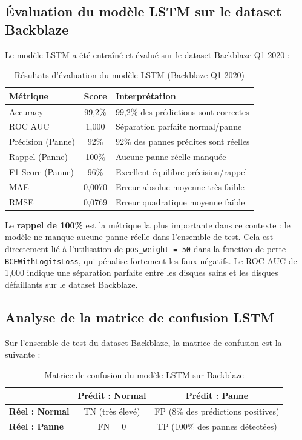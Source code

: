 \subsection{Évaluation du modèle LSTM sur le dataset Backblaze}

Le modèle LSTM a été entraîné et évalué sur le dataset Backblaze Q1 2020 :

\begin{table}[H]
\centering
\caption{Résultats d'évaluation du modèle LSTM (Backblaze Q1 2020)}
\begin{tabular}{|l|c|l|}
\hline
\rowcolor{lightblue}
\textbf{Métrique} & \textbf{Score} & \textbf{Interprétation} \\
\hline
Accuracy & 99,2\% & 99,2\% des prédictions sont correctes \\
\hline
ROC AUC & 1,000 & Séparation parfaite normal/panne \\
\hline
Précision (Panne) & 92\% & 92\% des pannes prédites sont réelles \\
\hline
Rappel (Panne) & 100\% & Aucune panne réelle manquée \\
\hline
F1-Score (Panne) & 96\% & Excellent équilibre précision/rappel \\
\hline
MAE & 0,0070 & Erreur absolue moyenne très faible \\
\hline
RMSE & 0,0769 & Erreur quadratique moyenne faible \\
\hline
\end{tabular}
\end{table}

Le \textbf{rappel de 100\%} est la métrique la plus importante dans ce contexte :
le modèle ne manque aucune panne réelle dans l'ensemble de test. Cela est directement
lié à l'utilisation de \texttt{pos\_weight = 50} dans la fonction de perte
\texttt{BCEWithLogitsLoss}, qui pénalise fortement les faux négatifs. Le ROC AUC de
1,000 indique une séparation parfaite entre les disques sains et les disques défaillants
sur le dataset Backblaze.

\subsection{Analyse de la matrice de confusion LSTM}

Sur l'ensemble de test du dataset Backblaze, la matrice de confusion est la suivante :

\begin{table}[H]
\centering
\caption{Matrice de confusion du modèle LSTM sur Backblaze}
\begin{tabular}{|l|c|c|}
\hline
\rowcolor{lightblue}
 & \textbf{Prédit : Normal} & \textbf{Prédit : Panne} \\
\hline
\textbf{Réel : Normal} & TN (très élevé) & FP (8\% des prédictions positives) \\
\hline
\textbf{Réel : Panne} & FN = 0 & TP (100\% des pannes détectées) \\
\hline
\end{tabular}
\end{table}

